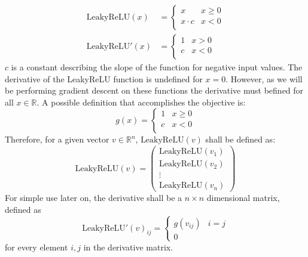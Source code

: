 \documentclass[12pt]{article}
\begin{document}
\begin{align} \label{eq:NN:ReLU}
\text{LeakyReLU}(x)& = \left\{
\begin{array}{ll}
x & x \ge 0 \\
x \cdot c & x < 0 \\
\end{array}
\right.\\\label{eq:NN:Relu_derivative}
\text{LeakyReLU}'(x) &= \left\{
\begin{array}{ll}
1 & x > 0 \\
c & x < 0 \\
\end{array}
\right.
\end{align}
\(c\) is a constant describing the slope of the function for negative input values. The derivative of the LeakyReLU function is undefined for \(x=0\). However, as we will be performing gradient descent on these functions the derivative must befined for all \(x \in \mathbb R\). A possible definition that accomplishes the objective is:
\begin{equation}
g(x) = 
\begin{cases}
1 & x \ge 0\\
c & x < 0\\
\end{cases}
\end{equation}
Therefore, for a given vector \(v \in \mathbb R^n\), \(\text{LeakyReLU}(v)\) shall be defined as:
\begin{equation}\label{eq:vecTanh}
\text{LeakyReLU}(v) = \left(
\begin{matrix}
\text{LeakyReLU}(v_1)\\
\text{LeakyReLU}(v_2)\\
\vdots\\
\text{LeakyReLU}(v_n)
\end{matrix}
\right)
\end{equation}
For simple use later on, the derivative shall be a \(n \times n\) dimensional matrix, defined as
\begin{equation}
\text{LeakyReLU}'(v)_{ij} = \left\{\begin{matrix}
g(v_{ij}) & i = j \\
0
\end{matrix}\right.
\end{equation}
for every element \(i,j\) in the derivative matrix.
\end{document}
